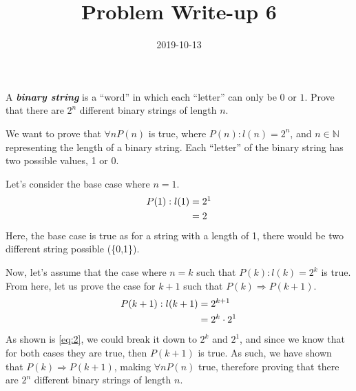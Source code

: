 \documentclass[a4paper,12pt]{article}
\title{Problem Write-up 6}
\date{2019-10-13}
\begin{document}
    \begin{problem}
        A \textbf{\textit{binary string}} is a “word” in which each “letter” can only be \(0\) or \(1\). Prove that there are \(2^n\) different binary strings of length \(n\).
    \end{problem}
    \begin{answer}
        We want to prove that \(\forall n P(n)\) is true, where \(P(n) : l(n) = 2^n\), and \(n \in \mathbb{N}\) representing the length of a binary string. Each “letter” of the binary string has two possible values, 1 or 0. 
        
        Let's consider the base case where \(n = 1\).
        \begin{align} \label{eq:1}
            P(1) : l(1) &= 2^1 \notag \\
            &= 2
        \end{align}
        Here, the base case is true as for a string with a length of 1, there would be two different string possible (\{0,1\}).

        Now, let's assume that the case where \(n = k\) such that \(P(k): l(k) = 2^k\) is true. From here, let us prove the case for \(k + 1\) such that \(P(k) \Rightarrow P(k + 1)\).
        \begin{align} \label{eq:2}
            P(k + 1) : l(k + 1) &= 2^{k + 1} \notag \\
            &= 2^k \cdot 2^1
        \end{align}
        As shown is \eqref{eq:2}, we could break it down to \(2^k\) and \(2^1\), and since we know that for both cases they are true, then \(P(k + 1)\) is true. As such, we have shown that \(P(k) \Rightarrow P(k + 1)\), making \(\forall n P(n)\) true, therefore proving that there are \(2^n\) different binary strings of length \(n\).
    \end{answer}
\end{document}
